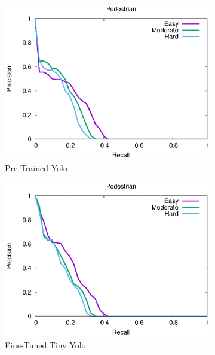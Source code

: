 \begin{figure}[H]
\centering
\begin{subfigure}[t]{.32\textwidth}
    \centering
    \includegraphics[width=1.0\linewidth]{img/yolo_Nov_4/plot_valid_30/pedestrian_detection.eps}
    \caption{Pre-Trained Yolo}
\end{subfigure}%
\begin{subfigure}[t]{.32\textwidth}
    \centering
    \includegraphics[width=1.0\linewidth]{img/yolo_Dec_7_tiny/plot_valid_30/pedestrian_detection.eps}
    \caption{Fine-Tuned Tiny Yolo}
\end{subfigure}%
\begin{subfigure}[t]{.32\textwidth}
    \centering

\end{subfigure}
\end{figure}
